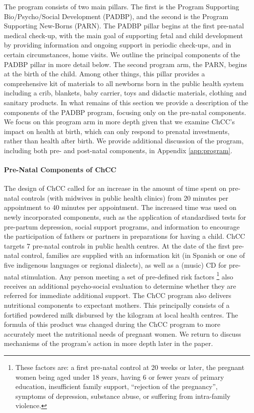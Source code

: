 \documentclass[12pt]{article}
\begin{document}
\begin{spacing}{1.4}
The program consists of two main pillars.  The first is the Program
Supporting Bio/Psycho/Social Development (PADBP), and the second
is the Program Supporting New-Borns (PARN).  The PADBP pillar begins
at the first pre-natal medical check-up, with the main goal of
supporting fetal and child development by providing information and
ongoing support in periodic check-ups, and in certain circumstances,
home visits.  We outline the principal components of the PADBP pillar
in more detail below.  The second program arm, the PARN, begins at the
birth of the child.  Among other things, this pillar provides a
comprehensive kit of materials to all newborns born in the public
health system including a crib, blankets, baby carrier, toys and
didactic materials, clothing and sanitary products.  In what remains
of this section we provide a description of the components of the PADBP
program, focusing only on the pre-natal components.  We focus on this
program arm in more depth given that we examine ChCC's impact on
health at birth, which can only respond to prenatal investments, rather
than health after birth. We provide additional discussion of the program,
including both pre- and post-natal components, in Appendix
\ref{app:program}.


\paragraph{Pre-Natal Components of ChCC} The design of ChCC called for
an increase in the amount of time spent on pre-natal controls (with
midwives in public health clinics) from 20 minutes per appointment to
40 minutes per appointment.  The increased time was used on newly
incorporated components, such as the application of standardised
tests for pre-partum depression, social support programs, and information
to encourage the participation of fathers or partners in preparations
for having a child.  ChCC targets 7 pre-natal controls in public
health centres.  At the date of the first pre-natal control, families are
supplied with an information kit (in Spanish or one of five indigenous
languages or regional dialects), as well as a (music) CD for pre-natal
stimulation.  Any person meeting a set of pre-defined risk factors%
\footnote{These factors are: a first pre-natal control at 20 weeks or
  later, the pregnant women being aged under 18 years, having 6 or
  fewer years of primary education, insufficient family support,
  ``rejection of the pregnancy'', symptoms of depression, substance
abuse, or suffering from intra-family violence.} also
receives an additional psycho-social evaluation to determine whether
they are referred for immediate additional support.  The ChCC program
also delivers nutritional components to expectant mothers.  This
principally consists of a fortified powdered milk disbursed by the
kilogram at local health centres.  The formula of this product was
changed during the ChCC program to more accurately meet the
nutritional needs of pregnant women. We return to discuss mechanisms
of the program's action in more depth later in the paper.%


\end{spacing}
\end{document}
